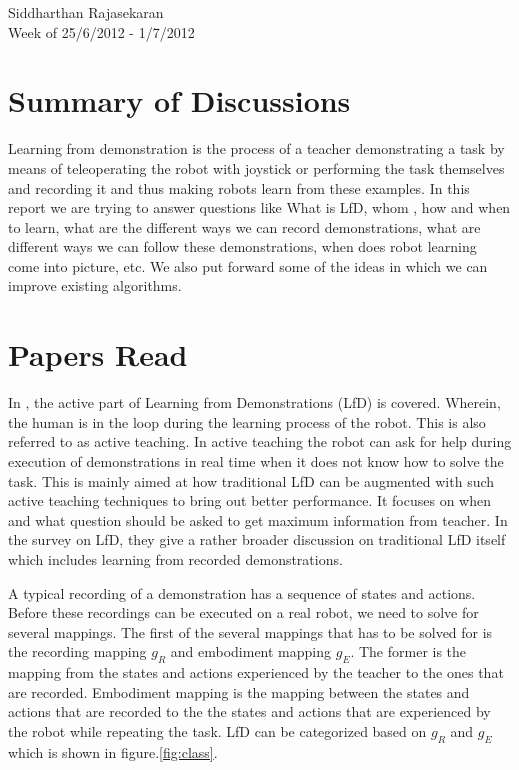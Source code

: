 \documentclass{article}[11pt]
\begin{document}
\begin{center}
Siddharthan Rajasekaran\\
Week of 25/6/2012 - 1/7/2012
\end{center}
\section{Summary of Discussions}

Learning from demonstration is the process of a teacher demonstrating a task by means of teleoperating the robot with joystick or performing the task themselves and recording it and thus making robots learn from these examples. In this report we are trying to answer questions like What is LfD, whom , how and when to learn, what are the different ways we can record demonstrations, what are different ways we can follow these demonstrations, when does robot learning come into picture, etc. We also put forward some of the ideas in which we can improve existing algorithms.

\section{Papers Read}
In \cite{hbr}, the active part of Learning from Demonstrations (LfD) is covered. Wherein, the human is in the loop during the learning process of the robot. This is also referred to as active teaching. In active teaching the robot can ask for help during execution of demonstrations in real time when it does not know how to solve the task. This is mainly aimed at how traditional LfD can be augmented with such active teaching techniques to bring out better performance. It focuses on when and what question should be asked to get maximum information from teacher. 
In the survey \cite{argall2009survey} on LfD, they give a rather broader discussion on traditional LfD itself which includes learning from recorded demonstrations. 

A typical recording of a demonstration has a sequence of states and actions. Before these recordings can be executed on a real robot, we need to solve for several mappings. The first of the several mappings that has to be solved for is the recording mapping $g_R$ and embodiment mapping $g_E$. The former is the mapping from the states and actions experienced by the teacher to the ones that are recorded. Embodiment mapping is the mapping between the states and actions that are recorded to the the states and actions that are experienced by the robot while repeating the task. LfD can be categorized based on $g_R$ and $g_E$ which is shown in figure.\ref{fig:class}. 
\end{document}

